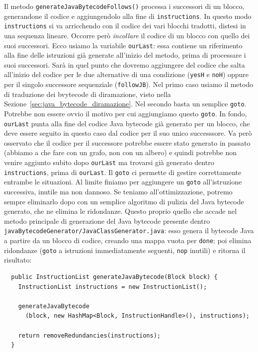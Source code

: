\noindent
Il metodo \texttt{generateJavaBytecodeFollows()} processa i successori di un blocco,
generandone il codice e aggiungendolo
alla fine di \texttt{instructions}. In questo modo
\texttt{instructions} si va arricchendo con il codice dei vari blocchi tradotti,
distesi in una sequenza lineare. Occorre per\`o \emph{incollare} il codice di
un blocco con quello dei suoi successori. Ecco \perche usiamo la variabile
\texttt{ourLast}: essa contiene un riferimento alla fine delle istruzioni
gi\`a generate all'inizio del metodo, prima di processare i suoi successori.
Sar\`a in quel punto che dovremo aggiungere del codice che salta all'inizio del
codice per le due alternative di una condizione (\texttt{yesH} e \texttt{noH})
oppure per il singolo successore sequenziale (\texttt{followJB}).
Nel primo caso usiamo il metodo di traduzione dei bvytecode di diramazione,
visto nella Sezione~\ref{sec:java_bytecode_diramazione}. Nel secondo
basta un semplice \texttt{goto}. Potrebbe non essere ovvio il motivo per cui
aggiungiamo questo \texttt{goto}. In fondo, \texttt{ourLast} punta alla fine
del codice Java bytecode gi\`a generato per un blocco, che deve essere seguito
in questo caso dal codice per il suo unico successsore. Va per\`o osservato che
il codice per il successore potrebbe essere stato generato in passato (abbiamo
a che fare con un grafo, non con un albero) e quindi potrebbe non venire aggiunto
subito dopo \texttt{ourLast} ma trovarsi gi\`a generato dentro \texttt{instructions},
prima di \texttt{ourLast}. Il \texttt{goto} ci permette di gestire correttamente entrambe
le situazioni. Al limite finiamo per aggiungere un \texttt{goto} all'istruzione
successiva, inutile ma non dannoso. Se teniamo all'ottimizzazione, potremo sempre eliminarlo dopo con un
semplice algoritmo di pulizia del Java bytecode generato, che ne elimina le ridondanze.
Questo \e proprio quello che accade nel metodo principale di generazione del Java bytecode
presente dentro \texttt{javaBytecodeGenerator/JavaClassGenerator.java}: esso genera il
bytecode Java a partire da un blocco di codice, creando una mappa vuota per \texttt{done};
poi elimina ridondanze (\texttt{goto} a istruzioni immediatamente seguenti, \texttt{nop}
inutili) e ritorna il risultato:
%
\begin{verbatim}
  public InstructionList generateJavaBytecode(Block block) {
    InstructionList instructions = new InstructionList();

    generateJavaBytecode
      (block, new HashMap<Block, InstructionHandle>(), instructions);

    return removeRedundancies(instructions);
  }
\end{verbatim}

